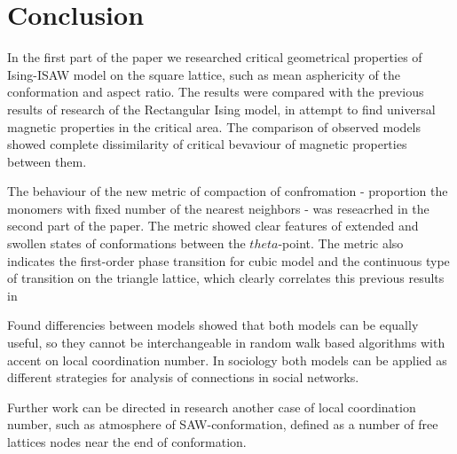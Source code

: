 \section{Conclusion}

In the first part of the paper we researched critical geometrical properties of Ising-ISAW model on the square lattice, such as mean asphericity of the conformation and aspect ratio. The results were compared with the previous results of research of the Rectangular Ising model, in attempt to find universal magnetic properties in the critical area. The comparison of observed models showed complete dissimilarity of critical bevaviour of magnetic properties between them.

The behaviour of the new metric of compaction of confromation - proportion the monomers with fixed number of the nearest neighbors - was reseacrhed in the second part of the paper. The metric showed clear features of extended and swollen states of conformations between the $theta$-point. The metric also indicates the first-order phase transition for cubic model and the continuous type of transition on the triangle lattice, which clearly correlates this previous results in \cite{Foster2021, faizullina2021critical}

Found differencies between models showed that both models can be equally useful, so they cannot be interchangeable in random walk based algorithms with accent on local coordination number. In sociology both models can be applied as different strategies for analysis of connections in social networks.

Further work can be directed in research another case of local coordination number, such as atmosphere of SAW-conformation, defined as a number of free lattices nodes near the end of conformation.